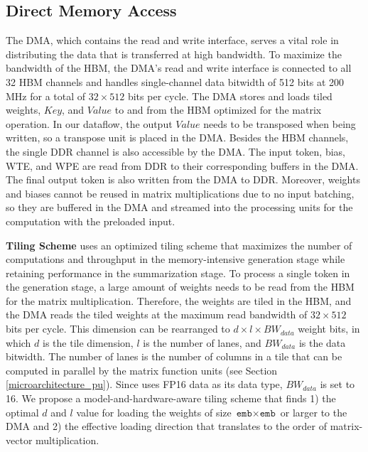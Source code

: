 \subsection{Direct Memory Access} \label{microarchitecture_dma}
The DMA, which contains the read and write interface, serves a vital role in distributing the data that is transferred at high bandwidth. To maximize the bandwidth of the HBM, the DMA's read and write interface is connected to all 32 HBM channels and handles single-channel data bitwidth of 512 bits at 200 MHz for a total of $32 \times 512$ bits per cycle. The DMA stores and loads tiled weights, $Key$, and $Value$ to and from the HBM optimized for the matrix operation. In our dataflow, the output $Value$ needs to be transposed when being written, so a transpose unit is placed in the DMA. Besides the HBM channels, the single DDR channel is also accessible by the DMA. 
The input token, bias, WTE, and WPE are read from DDR to their corresponding buffers in the DMA. The final output token is also written from the DMA to DDR. 
Moreover, weights and biases cannot be reused in matrix multiplications due to no input batching, so they are buffered in the DMA and streamed into the processing units for the computation with the preloaded input.



\textbf{Tiling Scheme} \sysname{} uses an optimized tiling scheme that maximizes the number of computations and throughput in the memory-intensive generation stage while retaining performance in the summarization stage. To process a single token in the generation stage, a large amount of weights needs to be read from the HBM for the matrix multiplication. Therefore, the weights are tiled in the HBM, and the DMA reads the tiled weights at the maximum read bandwidth of $32 \times 512$ bits per cycle. This dimension can be rearranged to $d \times l \times BW_{data}$ weight bits, in which $d$ is the tile dimension, $l$ is the number of lanes, and $BW_{data}$ is the data bitwidth. The number of lanes is the number of columns in a tile that can be computed in parallel by the matrix function units (see Section \ref{microarchitecture_pu}).
Since \sysname{} uses FP16 data as its data type, $BW_{data}$ is set to 16. We propose a model-and-hardware-aware tiling scheme that finds 1) the optimal $d$ and $l$ value for loading the weights of size $\texttt{emb}\times\texttt{emb}$ or larger to the DMA and 2) the effective loading direction that translates to the order of matrix-vector multiplication. 


